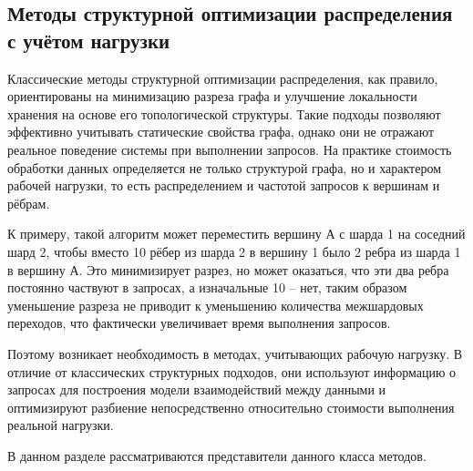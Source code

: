 \subsection{Методы структурной оптимизации распределения с учётом нагрузки}

Классические методы структурной оптимизации распределения, как правило, ориентированы на минимизацию разреза графа и улучшение локальности хранения на основе его топологической структуры. Такие подходы позволяют эффективно учитывать статические свойства графа, однако они не отражают реальное поведение системы при выполнении запросов. На практике стоимость обработки данных определяется не только структурой графа, но и характером рабочей нагрузки, то есть распределением и частотой запросов к вершинам и рёбрам. 

К примеру, такой алгоритм может переместить вершину А с шарда 1 на соседний шард 2, чтобы вместо 10 рёбер из шарда 2 в вершину 1 было 2 ребра из шарда 1 в вершину А. Это минимизирует разрез, но может оказаться, что эти два ребра постоянно частвуют в запросах, а изначальные 10 -- нет, таким образом уменьшение разреза не приводит к уменьшению количества межшардовых переходов, что фактически увеличивает время выполнения запросов.

Поэтому возникает необходимость в методах, учитывающих рабочую нагрузку. В отличие от классических структурных подходов, они используют информацию о запросах для построения модели взаимодействий между данными и оптимизируют разбиение непосредственно относительно стоимости выполнения реальной нагрузки.

В данном разделе рассматриваются представители данного класса методов.






